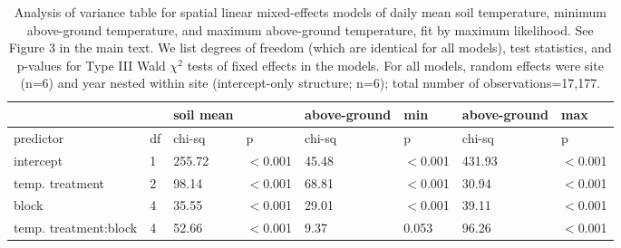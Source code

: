 \documentclass{article}
\begin{document}
\begin{table}[ht]
\centering
\caption{Analysis of variance table for spatial linear mixed-effects models of daily mean soil temperature, minimum above-ground temperature, and maximum above-ground temperature, fit by maximum likelihood. See Figure 3 in the main text. We list degrees of freedom (which are identical for all models), test statistics, and p-values for Type III Wald $\chi^{2}$ tests of fixed effects in the models. For all models, random effects were site (n=6) and year nested within site (intercept-only structure; n=6); total number of observations=17,177.} 
\label{table:blocks_space}
\begin{tabular}{|p{}|p{}|p{}p{}|p{}p{}|p{}p{}|}
   \hline
 &  & soil mean &   & above-ground & min & above-ground & max \\ 
   \hline
predictor & df & chi-sq & p & chi-sq & p & chi-sq & p \\ 
   \hline
intercept & 1 & 255.72 & $<$0.001 & 45.48 & $<$0.001 & 431.93 & $<$0.001 \\ 
  temp. treatment & 2 & 98.14 & $<$0.001 & 68.81 & $<$0.001 & 30.94 & $<$0.001 \\ 
  block & 4 & 35.55 & $<$0.001 & 29.01 & $<$0.001 & 39.11 & $<$0.001 \\ 
  temp. treatment:block & 4 & 52.66 & $<$0.001 & 9.37 & 0.053 & 96.26 & $<$0.001 \\ 
   \hline
\end{tabular}
\end{table}\clearpage
\end{document}
